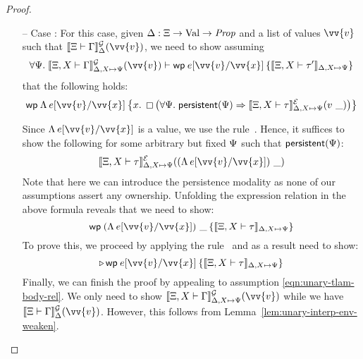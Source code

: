\begin{proof}
\begin{itemize}
  we have $\semVtype{\Tenv}{\typ}{\semenv}(\valB)$:
  \[ \later \wpre{\subst{(\subst{\expr}{\vv{\var}}{\vv{\val}})}{\var,
        f}{\valB, \Rec f x = \subst{\expr}{\vv{\var}}{\vv{\val}}}}
    {\semVtype{\Tenv}{\typ'}{\semenv}} \] This follows easily from our
  assumptions and the L\"ob induction hypothesis,
  \eqref{eqn:unary-loeb-ind-hyp-in-proof-of-Trec}, above.
\item[--] Case : For this case, given
  $\Delta : \Xi \to \text{Val} \to \textit{Prop}$ and a list of values
  $\vv{\val}$ such that $\semGtype{\Tenv}{\env}{\semenv}(\vv{\val})$,
  we need to show assuming
    \begin{align}
      \forall \predB.\; \semGtype{\Tenv, \tvar}{\env}
      {\semenv, \tvar \mapsto \predB}(\vv{\val}) \proves
      \wpre{\subst{\expr}{\vv{\var}}{\vv{\val}}}{\semVtype{\Tenv, \tvar}{\typ'}
      {\semenv, \tvar \mapsto \predB}}
      \label{eqn:unary-tlam-body-rel}
    \end{align}
    that the following holds:
   \begin{align*}
     \wpre{\subst{\TLam \expr}{\vv{\var}}{\vv{\val}}}{\var.\;
     \persistently\left(\forall \predB.\; \persistent{\predB} \Rightarrow
     \semEtype{\Tenv, \tvar}{\typ}{\semenv, \tvar \mapsto \predB}(\val~\_)\right)}
   \end{align*}

   Since $\TLam \subst{\expr}{\vv{\var}}{\vv{\val}}$ is a value, we
   use the rule~. Hence, it suffices to show the
   following for some arbitrary but fixed $\Psi$ such that
   $\textsf{\upshape persistent}(\Psi)$:
   \[\semEtype{\Tenv, \tvar}{\typ}{\semenv, \tvar \mapsto\predB}
     ((\TLam \subst{\expr}{\vv{\var}}{\vv{\val}})~\_)\] Note that here
   we can introduce the persistence modality as none of our
   assumptions assert any ownership. Unfolding the expression relation
   in the above formula reveals that we need to show:
   \[\wpre{(\TLam \subst{\expr}{\vv{\var}}{\vv{\val}})~\_}
     {\semVtype{\Tenv, \tvar}{\typ}{\semenv, \tvar \mapsto \predB}}
   \]
   To prove this, we proceed by applying the rule~
   and as a result need to show:
   \[\later \wpre{\subst{\expr}{\vv{\var}}{\vv{\val}}}
     {\semVtype{\Tenv, \tvar}{\typ}{\semenv, \tvar \mapsto \predB}}\]
   Finally, we can finish the proof by appealing to assumption
   \eqref{eqn:unary-tlam-body-rel}. We only need to show
   $\semGtype{\Tenv, \tvar}{\env}{\semenv, \tvar \mapsto
     \predB}(\vv{\val})$ while we have
   $\semGtype{\Tenv}{\env}{\semenv}(\vv{\val})$. However, this follows
   from Lemma~\ref{lem:unary-interp-env-weaken}.
\end{itemize}
\end{proof}


